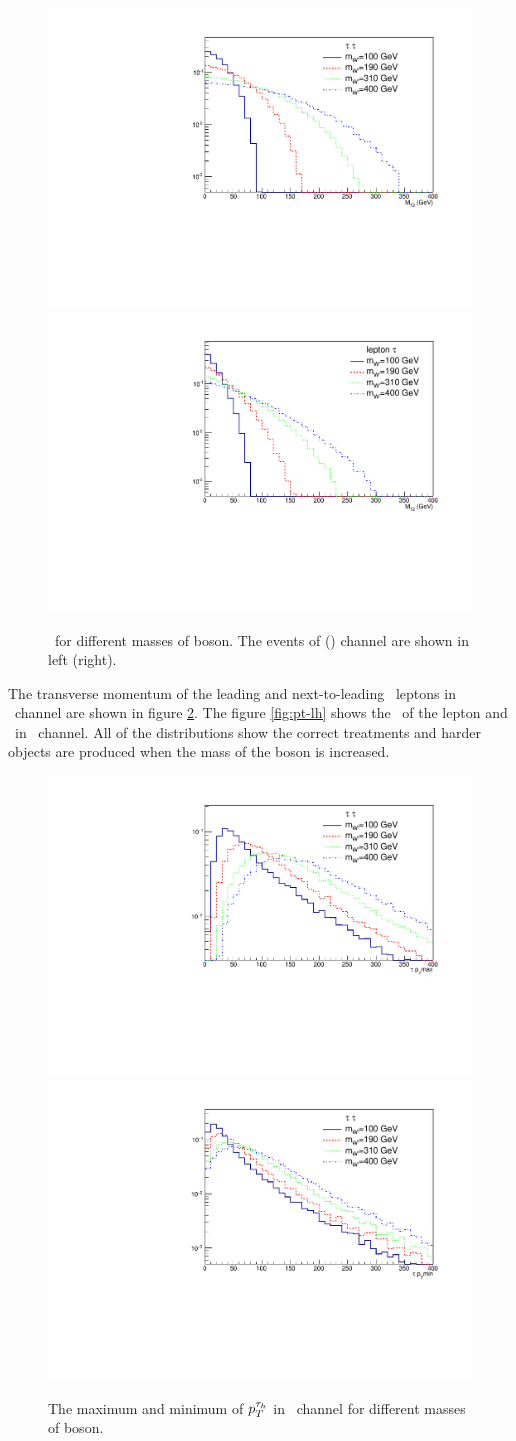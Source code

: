 \begin{figure}[htb]
	\centering
	\includegraphics*[width=.45\textwidth]{figs/MT2_hh.pdf}
	\hspace{3mm}
	\includegraphics*[width=.45\textwidth]{figs/MT2_lh.pdf}
	\caption{\mttwo ~for different masses of \wprime boson. The events of \tauTau (\lepTau) channel are shown in left (right).}
	\label{fig:mt2}
\end{figure} 
The transverse momentum of the leading and next-to-leading \Tau ~leptons in \tauTau ~channel are shown in figure \ref{fig:pt-hh}. The figure \ref{fig:pt-lh} shows the \pt ~of the lepton and \Tau ~in \lepTau ~channel. All of the distributions show the correct treatments and harder objects are produced when the mass of the \wprime boson is increased.
\begin{figure}[htb]
	\centering
	\includegraphics*[width=.45\textwidth]{figs/Pt_hh_max.pdf}
	\hspace{3mm}
	\includegraphics*[width=.45\textwidth]{figs/Pt_hh_min.pdf}
	\caption{The maximum  and minimum of $p_T^{\tau_h}$ in \tauTau ~channel for different masses of \wprime boson.}
	\label{fig:pt-hh}
\end{figure}
